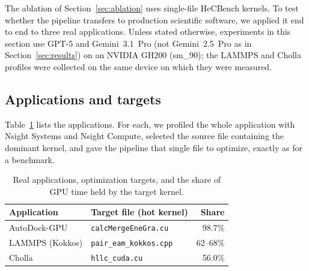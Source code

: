 The ablation of Section~\ref{sec:ablation} uses single-file HeCBench kernels. To test whether the
pipeline transfers to production scientific software, we applied it end to end to three real
applications. Unless stated otherwise, experiments in this section use GPT-5 and Gemini~3.1~Pro
(not Gemini~2.5~Pro as in Section~\ref{sec:results}) on an NVIDIA GH200 (sm\_90); the LAMMPS and
Cholla profiles were collected on the same device on which they were measured.

\subsection{Applications and targets}
Table~\ref{tab:apps} lists the applications. For each, we profiled the whole application with Nsight
Systems and Nsight Compute, selected the source file containing the dominant kernel, and gave the
pipeline that single file to optimize, exactly as for a benchmark.

\begin{table}[t]
\centering
\footnotesize
\caption{Real applications, optimization targets, and the share of GPU time held by the target kernel.}
\label{tab:apps}
\setlength{\tabcolsep}{3pt}
\begin{tabular}{@{}llr@{}}
\toprule
\textbf{Application} & \textbf{Target file (hot kernel)} & \textbf{Share} \\
\midrule
AutoDock-GPU & \texttt{calcMergeEneGra.cu} & 98.7\% \\
LAMMPS (Kokkos) & \texttt{pair\_eam\_kokkos.cpp} & 62--68\% \\
Cholla & \texttt{hllc\_cuda.cu} & 56.0\% \\
\bottomrule
\end{tabular}
\end{table}

